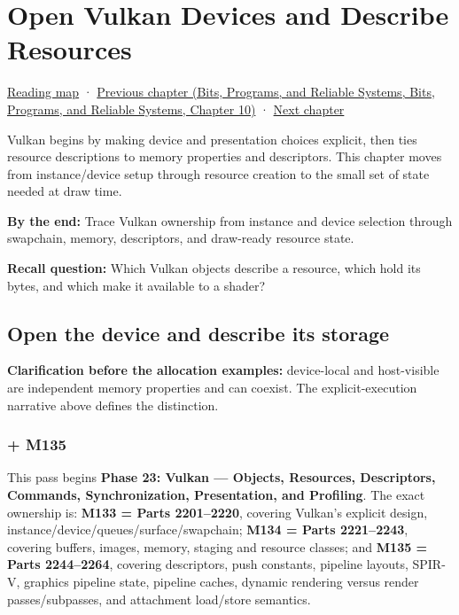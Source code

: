 \hypertarget{01-foundations-i-ch013}{}
\chapter{Open Vulkan Devices and Describe Resources}\label{stagechapter:01-foundations-i-ch013}\label{01-foundations-i-ch013-open-vulkan-devices-and-describe-resources}

\hyperref[volume-reading-map]{Reading map} · \href{../01-Bits-Programs-and-Reliable-Systems/main.pdf\#nameddest=01-foundations-i-ch012-commands-async-work-and-resource-lifetimes}{Previous chapter (Bits, Programs, and Reliable Systems, Bits, Programs, and Reliable Systems, Chapter 10)} · \hyperref[01-foundations-i-ch014-submit-synchronize-and-retire-gpu-work]{Next chapter}

Vulkan begins by making device and presentation choices explicit, then ties resource descriptions to memory properties and descriptors. This chapter moves from instance/device setup through resource creation to the small set of state needed at draw time.

\textbf{By the end:} Trace Vulkan ownership from instance and device selection through swapchain, memory, descriptors, and draw-ready resource state.

\textbf{Recall question:} Which Vulkan objects describe a resource, which hold its bytes, and which make it available to a shader?

\section{Open the device and describe its storage}\label{01-foundations-i-ch013-open-the-device-and-describe-its-storage}

\textbf{Clarification before the allocation examples:} device-local and host-visible are independent memory properties and can coexist. The explicit-execution narrative above defines the distinction.

\subsection{+ M135}\label{01-foundations-i-ch013-m135}

This pass begins \textbf{Phase 23: Vulkan --- Objects, Resources, Descriptors, Commands, Synchronization, Presentation, and Profiling}. The exact ownership is: \textbf{M133 = Parts 2201--2220}, covering Vulkan's explicit design, instance/device/queues/surface/swapchain; \textbf{M134 = Parts 2221--2243}, covering buffers, images, memory, staging and resource classes; and \textbf{M135 = Parts 2244--2264}, covering descriptors, push constants, pipeline layouts, SPIR-V, graphics pipeline state, pipeline caches, dynamic rendering versus render passes/subpasses, and attachment load/store semantics.

